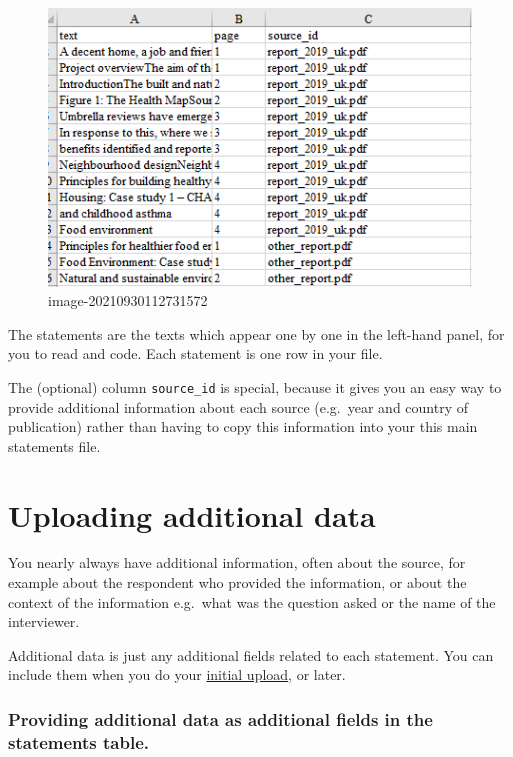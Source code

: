 \documentclass[
]{book}
\begin{document}
\begin{figure}
\centering
\includegraphics{_assets/image-20210930112731572.png}
\caption{image-20210930112731572}
\end{figure}

The statements are the texts which appear one by one in the left-hand panel, for you to read and code. Each statement is one row in your file.

The (optional) column \texttt{source\_id} is special, because it gives you an easy way to provide additional information about each source (e.g.~year and country of publication) rather than having to copy this information into your this main statements file.

\hypertarget{import-additional-data}{%
\chapter{Uploading additional data}\label{import-additional-data}}

You nearly always have additional information, often about the source, for example about the respondent who provided the information, or about the context of the information e.g.~what was the question asked or the name of the interviewer.

Additional data is just any additional fields related to each statement. You can include them when you do your \protect\hyperlink{upload-summary}{initial upload}, or later.

\hypertarget{providing-additional-data-as-additional-fields-in-the-statements-table.}{%
\subsection{Providing additional data as additional fields in the statements table.}\label{providing-additional-data-as-additional-fields-in-the-statements-table.}}
\end{document}

